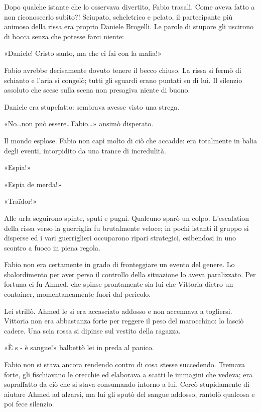 Dopo qualche istante che lo osservava divertito, Fabio trasalì. Come aveva fatto a non riconoscerlo subito?! Sciupato, scheletrico e pelato, il partecipante più animoso della rissa era proprio Daniele Brogelli. Le parole di stupore gli uscirono di bocca senza che potesse farci niente:

«Daniele! Cristo santo, ma che ci fai con la mafia!»

Fabio avrebbe decisamente dovuto tenere il becco chiuso. La rissa si fermò di schianto e l'aria si congelò; tutti gli sguardi erano puntati su di lui. Il silenzio assoluto che scese sulla scena non presagiva niente di buono.

Daniele era stupefatto: sembrava avesse visto una strega.

«No\ldots non può essere\ldots Fabio\ldots» ansimò disperato.

Il mondo esplose. Fabio non capì molto di ciò che accadde: era totalmente in balia degli eventi, intorpidito da una trance di incredulità.

«Espia!»

«Espia de merda!»

«Traïdor!»

Alle urla seguirono spinte, sputi e pugni. Qualcuno sparò un colpo. L'escalation della rissa verso la guerriglia fu brutalmente veloce; in pochi istanti il gruppo si disperse ed i vari guerriglieri occuparono ripari strategici, esibendosi in uno scontro a fuoco in piena regola.

Fabio non era certamente in grado di fronteggiare un evento del genere. Lo sbalordimento per aver perso il controllo della situazione lo aveva paralizzato. Per fortuna ci fu Ahmed, che spinse prontamente sia lui che Vittoria dietro un container, momentaneamente fuori dal pericolo.

Lei strillò. Ahmed le si era accasciato addosso e non accennava a togliersi. Vittoria non era abbastanza forte per reggere il peso del marocchino: lo lasciò cadere. Una scia rossa si dipinse sul vestito della ragazza.

«È s - è sangue!» balbettò lei in preda al panico.

Fabio non si stava ancora rendendo contro di cosa stesse succedendo. Tremava forte, gli fischiavano le orecchie ed elaborava a scatti le immagini che vedeva; era sopraffatto da ciò che si stava consumando intorno a lui. Cercò stupidamente di aiutare Ahmed ad alzarsi, ma lui gli sputò del sangue addosso, rantolò qualcosa e poi fece silenzio.


